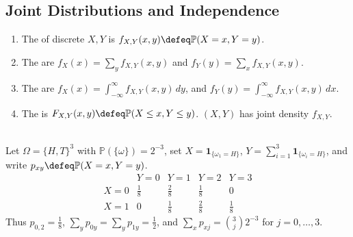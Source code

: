 \subsection{Joint Distributions and Independence}
\begin{definition} \label{def:joint-distributions-and-marginals} 
\begin{enumerate}[label=(\roman*)]
\setlength{\itemsep}{0pt}
\item The  of discrete $X,Y$ is $f_{X,Y}(x,y)\defeq\mathbb{P}(X=x,Y=y)$.
\item The  are $f_X(x)=\sum\limits_y f_{X,Y}(x,y)$ and $f_Y(y)=\sum\limits_x f_{X,Y}(x,y)$.
\item The  are $f_X(x)=\int_{-\infty}^{\infty}f_{X,Y}(x,y)\,dy$, and $f_Y(y)=\int_{-\infty}^{\infty}f_{X,Y}(x,y)\,dx$.
\item The  is $F_{X,Y}(x,y)\defeq\mathbb{P}(X\leq x,Y\leq y)$. $(X,Y)$ has joint density $f_{X,Y}$.
\end{enumerate}
\end{definition}

\begin{example} \label{ex:three-toss-joint-mass-table} \\
Let $\Omega=\{H,T\}^3$ with $\mathbb{P}(\{\omega\})=2^{-3}$, set $X=\mathbf{1}_{\{\omega_1=H\}}$, $Y=\sum\limits_{i=1}^{3}\mathbf{1}_{\{\omega_i=H\}}$, and write $p_{xy}\defeq\mathbb{P}(X=x,Y=y)$.
\[
\begin{array}{c|cccc}
&Y=0&Y=1&Y=2&Y=3\\ \hline
X=0&\frac{1}{8}&\frac{2}{8}&\frac{1}{8}&0\\
X=1&0&\frac{1}{8}&\frac{2}{8}&\frac{1}{8}
\end{array}
\]
Thus $p_{0,2}=\frac{1}{8}$, $\sum\limits_y p_{0y}=\sum\limits_y p_{1y}=\frac{1}{2}$, and $\sum\limits_x p_{xj}=\binom{3}{j}2^{-3}$ for $j=0,\ldots,3$.
\end{example}

